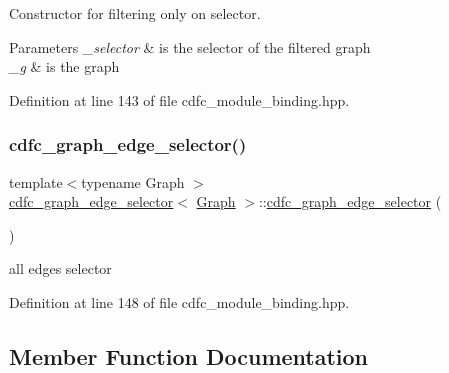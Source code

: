 Constructor for filtering only on selector. 


\begin{DoxyParams}{Parameters}
{\em \+\_\+selector} & is the selector of the filtered graph \\
\hline
{\em \+\_\+g} & is the graph \\
\hline
\end{DoxyParams}


Definition at line 143 of file cdfc\+\_\+module\+\_\+binding.\+hpp.

\mbox{\label{structcdfc__graph__edge__selector_a50d53f893681b6d7e51dae085eddc2af}} 
\subsubsection{\texorpdfstring{cdfc\+\_\+graph\+\_\+edge\+\_\+selector()}{cdfc\_graph\_edge\_selector()}\hspace{0.1cm}{\footnotesize\ttfamily [2/2]}}
{\footnotesize\ttfamily template$<$typename Graph $>$ \\
\hyperlink{structcdfc__graph__edge__selector}{cdfc\+\_\+graph\+\_\+edge\+\_\+selector}$<$ \hyperlink{structGraph}{Graph} $>$\+::\hyperlink{structcdfc__graph__edge__selector}{cdfc\+\_\+graph\+\_\+edge\+\_\+selector} (\begin{DoxyParamCaption}{ }\end{DoxyParamCaption})\hspace{0.3cm}{\ttfamily [inline]}}



all edges selector 



Definition at line 148 of file cdfc\+\_\+module\+\_\+binding.\+hpp.



\subsection{Member Function Documentation}
\mbox{\label{structcdfc__graph__edge__selector_a121b4f305b4bb3ca39a627d4f6666145}} 
